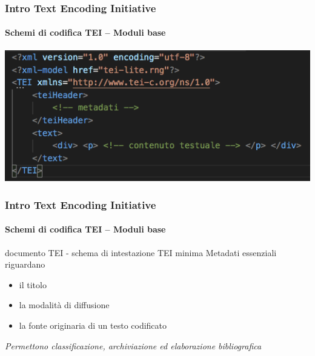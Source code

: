 



\begin{frame}
	\frametitle{Intro Text Encoding Initiative}
	\framesubtitle{Schemi di codifica TEI – Moduli base}
	\addtocounter{nframe}{1}

	\begin{center}
		\includegraphics[width=.95\textwidth]{imgs/esempio2.png}
    \end{center}
    
   

\end{frame}

\begin{frame}
	\frametitle{Intro Text Encoding Initiative}
	\framesubtitle{Schemi di codifica TEI – Moduli base}
	\addtocounter{nframe}{1}

	\begin{block}{documento TEI - schema di intestazione TEI minima}
		Metadati essenziali riguardano 
		\begin{itemize}
			\item il titolo
			\item la modalità di diffusione
			\item la fonte originaria di un testo codificato
		\end{itemize}
	\end{block}
	
	\textit{Permettono classificazione, archiviazione ed elaborazione bibliografica}
    
\end{frame}

